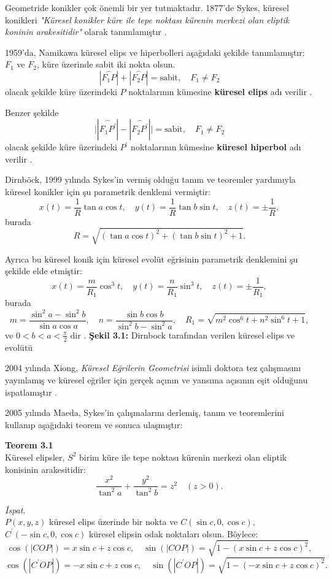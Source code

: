 \documentclass[a4paper,12pt]{article}
\begin{document}
Geometride konikler çok önemli bir yer tutmaktadır. 1877’de Sykes, küresel konikleri 
\textit{"Küresel konikler küre ile tepe noktası kürenin merkezi olan eliptik koninin arakesitidir"} 
olarak tanımlamıştır \cite{ref1}.

1959’da, Namikawa küresel elips ve hiperbolleri aşağıdaki şekilde tanımlamıştır: $F_1$ ve $F_2$, küre üzerinde sabit iki nokta olsun.
\[
|\overset{\frown}{F_1P}| + |\overset{\frown}{F_2P}| = \text{sabit}, \quad F_1 \neq F_2
\tag{3.1}
\]
olacak şekilde küre üzerindeki $P$ noktalarının kümesine \textbf{küresel elips} adı verilir \cite{ref2}.

Benzer şekilde
\[
\big||\overset{\frown}{F_1P^\prime}| - |\overset{\frown}{F_2P^\prime}|\big| = \text{sabit}, \quad F_1 \neq F_2
\tag{3.2}
\]
olacak şekilde küre üzerindeki $P^\prime$ noktalarının kümesine \textbf{küresel hiperbol} adı verilir \cite{ref2}.

Dirnböck, 1999 yılında Sykes’in vermiş olduğu tanım ve teoremler yardımıyla küresel konikler için şu parametrik denklemi vermiştir:
\[
x(t) = \frac{1}{R} \tan a \cos t, \quad
y(t) = \frac{1}{R} \tan b \sin t, \quad
z(t) = \pm \frac{1}{R},
\]
burada
\[
R = \sqrt{(\tan a \cos t)^2 + (\tan b \sin t)^2 + 1}.
\]

Ayrıca bu küresel konik için küresel evolüt eğrisinin parametrik denklemini şu şekilde elde etmiştir:
\[
x(t) = \frac{m}{R_1} \cos^3 t, \quad
y(t) = \frac{n}{R_1} \sin^3 t, \quad
z(t) = \pm \frac{1}{R_1},
\]
burada
\[
m = \frac{\sin^2 a - \sin^2 b}{\sin a \cos a}, \quad
n = \frac{\sin b \cos b}{\sin^2 b - \sin^2 a}, \quad
R_1 = \sqrt{m^2 \cos^6 t + n^2 \sin^6 t + 1},
\]
ve $0 < b < a < \frac{\pi}{2}$ dir \cite{ref3}.
\textbf{Şekil 3.1:} Dirnbock tarafından verilen küresel elips ve evolütü

2004 yılında Xiong, \textit{Küresel Eğrilerin Geometrisi} isimli doktora tez çalışmasını yayınlamış ve küresel eğriler için gerçek açının ve yansıma açısının eşit olduğunu ispatlamıştır \cite{ref1}.

2005 yılında Maeda, Sykes’in çalışmalarını derlemiş, tanım ve teoremlerini kullanıp aşağıdaki teorem ve sonuca ulaşmıştır:

\textbf{Teorem 3.1} \\
Küresel elipsler, $S^2$ birim küre ile tepe noktası kürenin merkezi olan eliptik konisinin arakesitidir:
\[
\frac{x^2}{\tan^2 a} + \frac{y^2}{\tan^2 b} = z^2 \quad (z > 0).
\tag{3.3}
\]

\textit{İspat.} \\
$P(x, y, z)$ küresel elips üzerinde bir nokta ve $C(\sin c, 0, \cos c)$, $C^\prime(-\sin c, 0, \cos c)$ küresel elipsin odak noktaları olsun. Böylece:
\[
\cos(|COP|) = x \sin c + z \cos c, \quad \sin(|COP|) = \sqrt{1 - (x \sin c + z \cos c)^2},
\]
\[
\cos(|C^\prime OP|) = -x \sin c + z \cos c, \quad \sin(|C^\prime OP|) = \sqrt{1 - (-x \sin c + z \cos c)^2}.
\]
\end{document}
